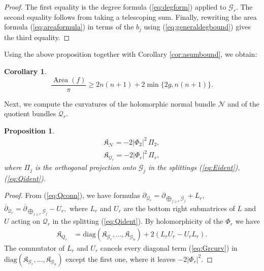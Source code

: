 \documentclass[11pt]{article}
\newtheorem{prop}[theorem]{Proposition}
\newtheorem{cor}[theorem]{Corollary}
\theoremstyle{definition}
\newcommand{\delbar}{\overline{\partial}}
\numberwithin{equation}{section}
\begin{document}
\begin{proof}
	The first equality is the degree formula (\ref{eq:degform}) applied to $\mathcal{G}_r.$ The second equality follows from taking a telescoping sum. Finally, rewriting the area formula (\ref{eq:areaformula}) in terms of the $b_j$ using (\ref{eq:generaldegbound}) gives the third equality. 
\end{proof}


Using the above proposition together with Corollary \ref{cor:asumbound}, we obtain:

\begin{cor}
\begin{equation}\label{eq:generalarealowerbound}
    \frac{\operatorname{Area}(f)}{\pi} \geq 2n(n+1) + 2 \min\lbrace 2g, n(n+1) \rbrace.
\end{equation}
\end{cor}

Next, we compute the curvatures of the holomorphic normal bundle $\mathcal{N}$ and of the quotient bundles $\mathcal{Q}_r$.

\begin{prop}
	\begin{align}
		\mathfrak{K}_{\mathcal{N}} = - 2 \lvert \Phi_2 \rvert^2 \, \Pi_2,                     \\
		\mathfrak{K}_{\mathcal{Q}_r} = - 2 \lvert \Phi_r \rvert^2 \, \Pi_r, \label{eq:Qkcurv} 
	\end{align}
	where $\Pi_j$ is the orthogonal projection onto $\mathcal{G}_j$ in the splittings (\ref{eq:Eident}), (\ref{eq:Qident}).
\end{prop}

\begin{proof}
	From (\ref{eq:Qconn}), we have formulas $\partial_{\mathcal{Q}_r} = \partial_{\bigoplus_{j \geq r} \mathcal{G}_j} + L_r,$ $\delbar_{\mathcal{Q}_r} = \delbar_{\bigoplus_{j \geq r} \mathcal{G}_j} - U_r,$ where $L_r$ and $U_r$ are the bottom right submatrices of $L$ and $U$ acting on $\mathcal{Q}_r$ in the splitting (\ref{eq:Qident}). By holomorphicity of the $\Phi_r$ we have
	\begin{equation*}
		\begin{aligned}
			\mathfrak{K}_{Q_r} & = \mathrm{diag}(\mathfrak{K}_{\mathcal{G}_r}, \ldots, \mathfrak{K}_{\mathcal{G}_n}) + 2 (L_r U_r - U_r L_r). 
		\end{aligned}
	\end{equation*}
	The commutator of $L_r$ and $U_r$ cancels every diagonal term (\ref{eq:Grcurv}) in $\mathrm{diag}(\mathfrak{K}_{\mathcal{G}_r}, \ldots, \mathfrak{K}_{\mathcal{G}_n})$ except the first one, where it leaves $-2 \lvert \Phi_r \rvert^2.$ 
\end{proof}
\end{document}
